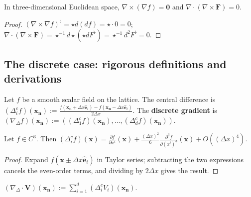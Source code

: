 \begin{proposition}\label{prop:three_operator_identities}
In three-dimensional Euclidean space, $\nabla\times(\nabla f)=\mathbf{0}$ and $\nabla\cdot(\nabla\times\mathbf{F})=0$.
\end{proposition}

\begin{proof}
$(\nabla\times\nabla f)^\flat=\star d(df)=\star\cdot 0=0$; $\nabla\cdot(\nabla\times\mathbf{F})=\star^{-1}d\star(\star dF^\flat)=\star^{-1}d^2F^\flat=0$.
\end{proof}

\subsection{The discrete case: rigorous definitions and derivations}

\begin{definition}\label{def:discrete_gradient_strict}
Let $f$ be a smooth scalar field on the lattice. The central difference is $(\Delta_i^cf)(\mathbf{x}_{\mathbf{n}}):=\frac{f(\mathbf{x}_{\mathbf{n}}+\Delta x\hat{\mathbf{e}}_i)-f(\mathbf{x}_{\mathbf{n}}-\Delta x\hat{\mathbf{e}}_i)}{2\Delta x}$. The \textbf{discrete gradient} is $(\nabla_{\Delta}f)(\mathbf{x}_{\mathbf{n}}):=((\Delta_1^cf)(\mathbf{x}_{\mathbf{n}}),\dots,(\Delta_d^cf)(\mathbf{x}_{\mathbf{n}}))$.
\end{definition}

\begin{proposition}\label{prop:discrete_gradient_error}
Let $f\in C^3$. Then $(\Delta_i^cf)(\mathbf{x})=\frac{\partial f}{\partial x^i}(\mathbf{x})+\frac{(\Delta x)^2}{6}\frac{\partial^3f}{\partial(x^i)^3}(\mathbf{x})+O((\Delta x)^4)$.
\end{proposition}

\begin{proof}
Expand $f(\mathbf{x}\pm\Delta x\hat{\mathbf{e}}_i)$ in Taylor series; subtracting the two expressions cancels the even-order terms, and dividing by $2\Delta x$ gives the result.
\end{proof}

\begin{definition}\label{def:discrete_divergence_strict}
$(\nabla_{\Delta}\cdot\mathbf{V})(\mathbf{x}_{\mathbf{n}}):=\sum_{i=1}^d(\Delta_i^cV_i)(\mathbf{x}_{\mathbf{n}})$.
\end{definition}

